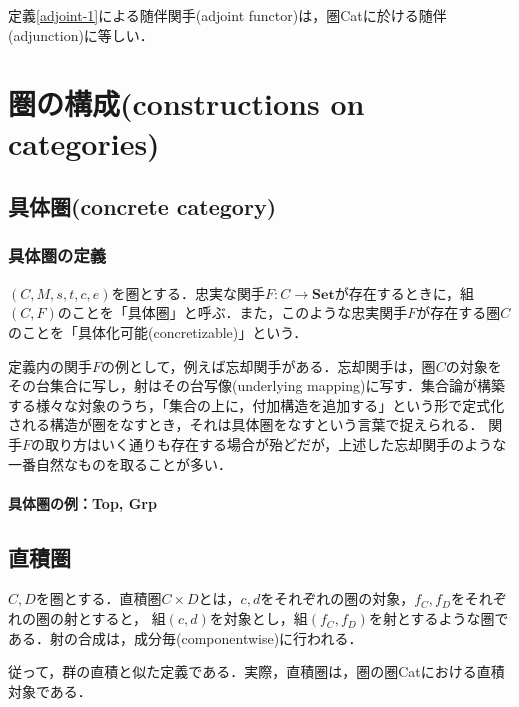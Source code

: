 \documentclass[uplatex, 12pt, dvipdfmx]{jsreport}
\begin{document}
\begin{proposition}\rm{}
    定義\ref{adjoint-1}による随伴関手(adjoint functor)は，圏Catに於ける随伴(adjunction)に等しい．
\end{proposition}

\chapter{圏の構成(constructions on categories)}

\section{具体圏(concrete category)}

\subsection{具体圏の定義}
\begin{shadebox}\begin{definition}[具体圏]\rm{}
    $(C,M,s,t,c,e)$を圏とする．忠実な関手$F:C\rightarrow \mathbf{Set}$が存在するときに，組$(C,F)$のことを「具体圏」と呼ぶ．また，このような忠実関手$F$が存在する圏$C$のことを「具体化可能(concretizable)」という．
\end{definition}\end{shadebox}
定義内の関手$F$の例として，例えば忘却関手がある．忘却関手は，圏$C$の対象をその台集合に写し，射はその台写像(underlying mapping)に写す．集合論が構築する様々な対象のうち，「集合の上に，付加構造を追加する」という形で定式化される構造が圏をなすとき，それは具体圏をなすという言葉で捉えられる．
関手$F$の取り方はいく通りも存在する場合が殆どだが，上述した忘却関手のような一番自然なものを取ることが多い．

\subsubsection{具体圏の例：\textbf{Top, Grp}}

\section{直積圏}

\begin{definition}
    $C,D$を圏とする．直積圏$C\times D$とは，$c,d$をそれぞれの圏の対象，$f_C,f_D$をそれぞれの圏の射とすると，
    組$(c,d)$を対象とし，組$(f_C,f_D)$を射とするような圏である．射の合成は，成分毎(componentwise)に行われる．
\end{definition}
従って，群の直積と似た定義である．実際，直積圏は，圏の圏Catにおける直積対象である．
\end{document}
